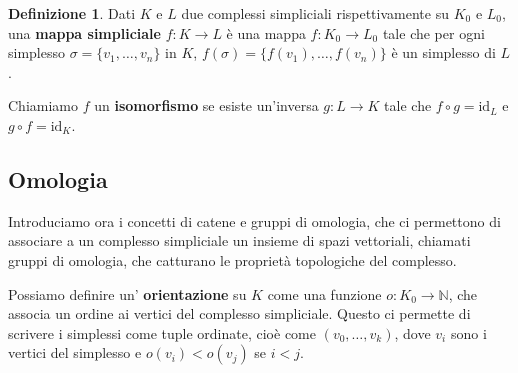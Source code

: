 \documentclass[a4paper, 12pt]{article}
\theoremstyle{definition}
\newtheorem{definition}{Definizione}[section]
\newtheorem{examplebox}{Esempio}[section]
\theoremstyle{remark}
\begin{document}
\begin{definition}
    Dati $K$ e $L$ due complessi simpliciali rispettivamente su $K_0$ e $L_0$, una \textbf{mappa simpliciale} $f : K \rightarrow L$ è una mappa $f : K_0 \to L_0$ tale che per ogni simplesso $\sigma = \{v_1, \dots, v_n\}$ in $K$, $f(\sigma) = \{f(v_1), \dots, f(v_n)\}$ è un simplesso di $L$.

    Chiamiamo $f$ un \textbf{isomorfismo} se esiste un'inversa $g: L \rightarrow K$ tale che $f \circ g = \text{id}_L$ e $g \circ f = \text{id}_K$.
\end{definition}
    
%         
    

\subsection{Omologia}
Introduciamo ora i concetti di catene e gruppi di omologia, che ci permettono di associare a un complesso simpliciale un insieme di spazi vettoriali, chiamati gruppi di omologia, che catturano le proprietà topologiche del complesso.

Possiamo definire un' \textbf{orientazione} su $K$ come una funzione $o : K_0 \to \mathbb{N}$, che associa un ordine ai vertici del complesso simpliciale. Questo ci permette di scrivere i simplessi come tuple ordinate, cioè come $(v_0, \ldots, v_k)$, dove $v_i$ sono i vertici del simplesso e $o(v_i) < o(v_j)$ se $i < j$. %
\end{document}
